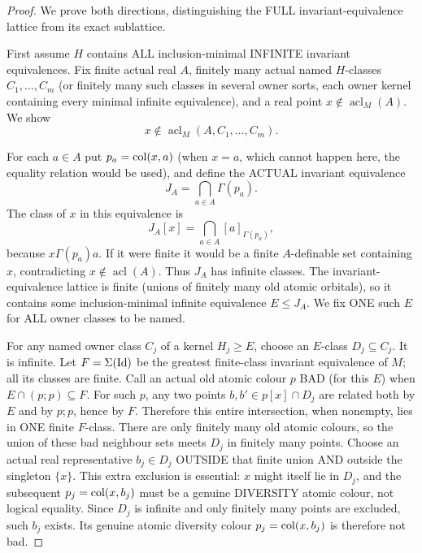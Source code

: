 \begin{proof}
We prove both directions, distinguishing
the FULL invariant-equivalence lattice
from its exact sublattice.

First assume \(H\) contains ALL
inclusion-minimal INFINITE invariant
equivalences. Fix finite actual real
\(A\), finitely many actual named
\(H\)-classes \(C_1,\ldots,C_m\)
(or finitely many such classes in
several owner sorts, each owner kernel
containing every minimal infinite
equivalence), and a real point
\(x\notin\operatorname{acl}_M(A)\).
We show
\[
     x\notin
     \operatorname{acl}_M(A,C_1,\ldots,C_m).
\]

For each \(a\in A\) put
\(p_a=\operatorname{col}(x,a)\) (when \(x=a\),
which cannot happen here, the
equality relation would be used),
and define the ACTUAL invariant
equivalence
\[
       J_A=\bigcap_{a\in A}\Gamma(p_a).
\]
The class of \(x\) in this
equivalence is
\[
       J_A[x]=
       \bigcap_{a\in A}
                   [a]_{\Gamma(p_a)},
\]
because \(x\Gamma(p_a)a\).
If it were finite it would be
a finite \(A\)-definable set
containing \(x\), contradicting
\(x\notin\operatorname{acl}(A)\).
Thus \(J_A\) has infinite classes.
The invariant-equivalence lattice
is finite (unions of finitely many
old atomic orbitals), so it contains
some inclusion-minimal infinite
equivalence \(E\le J_A\).
We fix ONE such \(E\) for ALL
owner classes to be named.

For any named owner class \(C_j\)
of a kernel \(H_j\ge E\), choose
an \(E\)-class \(D_j\subseteq C_j\).
It is infinite. Let \(F=\Sigma(\mathrm{Id})\)
be the greatest finite-class
invariant equivalence of \(M\);
all its classes are finite.
Call an actual old atomic colour
\(p\) BAD (for this \(E\)) when
\(E\cap(p;p)\subseteq F\).
For such \(p\), any two points
\(b,b'\in p[x]\cap D_j\)
are related both by \(E\) and
by \(p;p\), hence by \(F\).
Therefore this entire intersection,
when nonempty, lies in ONE
finite \(F\)-class. There are
only finitely many old atomic
colours, so the union of these
bad neighbour sets meets
\(D_j\) in finitely many points.
Choose an actual real representative
\(b_j\in D_j\) OUTSIDE that finite
union AND outside the singleton
\(\{x\}\). This extra exclusion
is essential: \(x\) might itself
lie in \(D_j\), and the subsequent
\(p_j=\operatorname{col}(x,b_j)\) must be a
genuine DIVERSITY atomic colour,
not logical equality. Since
\(D_j\) is infinite and only
finitely many points are
excluded, such \(b_j\) exists.
Its genuine atomic diversity
colour \(p_j=\operatorname{col}(x,b_j)\)
is therefore not bad.


\end{proof}
